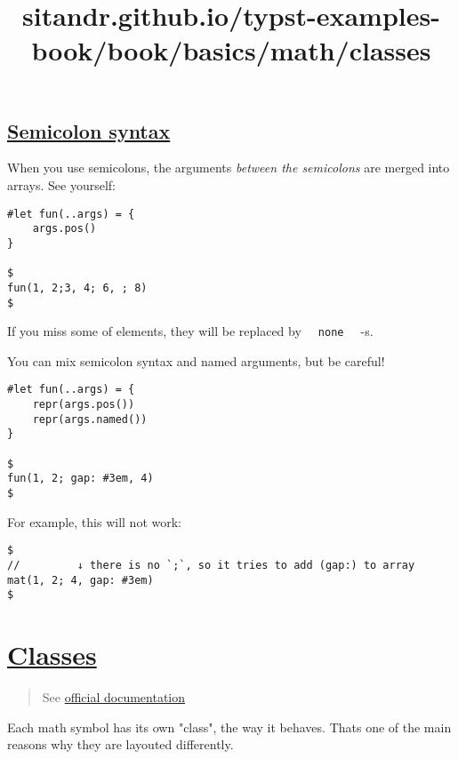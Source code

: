 \subsection{\texorpdfstring{\hyperref[semicolon-syntax]{Semicolon
syntax}}{Semicolon syntax}}\label{semicolon-syntax}

When you use semicolons, the arguments \emph{between the semicolons} are
merged into arrays. See yourself:

\begin{verbatim}
#let fun(..args) = {
    args.pos()
}

$
fun(1, 2;3, 4; 6, ; 8)
$
\end{verbatim}

\pandocbounded{}

If you miss some of elements, they will be replaced by
\texttt{\ }{\texttt{\ none\ }}\texttt{\ } -s.

You can mix semicolon syntax and named arguments, but be careful!

\begin{verbatim}
#let fun(..args) = {
    repr(args.pos())
    repr(args.named())
}

$
fun(1, 2; gap: #3em, 4)
$
\end{verbatim}

\pandocbounded{}

For example, this will not work:

\begin{verbatim}
$
//         ↓ there is no `;`, so it tries to add (gap:) to array
mat(1, 2; 4, gap: #3em)
$
\end{verbatim}


\title{sitandr.github.io/typst-examples-book/book/basics/math/classes}

\section{\texorpdfstring{\hyperref[classes]{Classes}}{Classes}}\label{classes}

\begin{quote}
See \href{https://typst.app/docs/reference/math/class/}{official
documentation}
\end{quote}

Each math symbol has its own "class", the way it behaves.
That\textquotesingle s one of the main reasons why they are layouted
differently.

